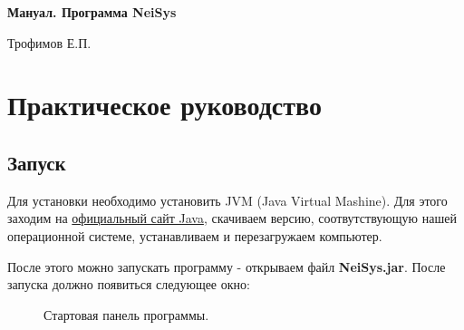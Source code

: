 \documentclass{article}
\numberwithin{equation}{section}
\begin{document}
\def\figurename{Рисунок}



\pagestyle{empty}
\begin{center}

{\LARGE\bf{Мануал. Программа NeiSys}}\par
\Large{Трофимов Е.П.}

\end{center}

\newpage



\setcounter{tocdepth}{2}  %
\tableofcontents


\newpage




\section{Практическое руководство}
\subsection{Запуск}


\qquad Для установки необходимо установить JVM (Java Virtual Mashine). Для этого заходим на \href{https://java.com/ru/download/manual.jsp}{официальный сайт Java}, скачиваем версию, соотвутствующую нашей операционной системе, устанавливаем и перезагружаем компьютер. 



После этого можно запускать программу - открываем файл {\bf NeiSys.jar}. После запуска должно появиться следующее окно:

\begin{figure}[h]
\caption{Стартовая панель программы.}
\label{ris:image}
\end{figure}
\end{document}
